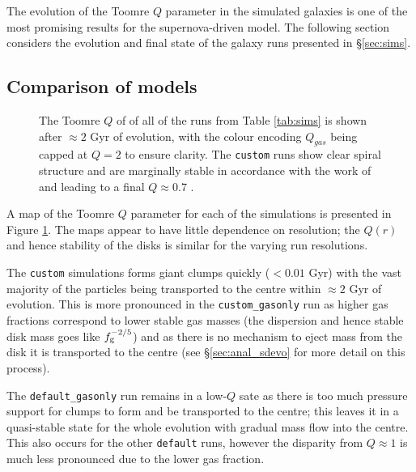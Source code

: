 The evolution of the Toomre $Q$ parameter in the simulated galaxies is one of the most promising results for the supernova-driven model.
The following section considers the evolution and final state of the galaxy runs presented in \S \ref{sec:sims}.

\subsection{Comparison of models}

\begin{figure}[!ht]
    \leavevmode\rlap{\usebox{\graphicsbox}}%
    \begin{minipage}[b]{0.63\wd\graphicsbox}%
        \caption{The Toomre $Q$ of of all of the runs from Table \ref{tab:sims} is shown after $\approx 2$ Gyr of evolution, with the colour encoding $Q_{gas}$ being capped at $Q=2$ to ensure clarity. The {\tt custom} runs show clear spiral structure and are marginally stable in accordance with the work of \citet{hopkins_stellar_2012} and \citep{behrendt_structure_2015} leading to a final $Q \approx 0.7$ .}
        \label{fig:toomqsimbigfig}
    \end{minipage}\hspace*{0.33\wd\graphicsbox}%
\end{figure}

A map of the Toomre $Q$ parameter for each of the simulations is presented in Figure \ref{fig:toomqsimbigfig}.
The maps appear to have little dependence on resolution; the $Q(r)$ and hence stability of the disks is similar for the varying run resolutions.

The {\tt custom} simulations forms giant clumps quickly ($<0.01$ Gyr) with the vast majority of the particles being transported to the centre within $\approx 2$ Gyr of evolution.
This is more pronounced in the {\tt custom\_gasonly} run as higher gas fractions correspond to lower stable gas masses (the dispersion and hence stable disk mass goes like $f_\mathrm{g}^{-2/5}$) and as there is no mechanism to eject mass from the disk it is transported to the centre (see \S \ref{sec:anal_sdevo} for more detail on this process).

The {\tt default\_gasonly} run remains in a low-$Q$ sate as there is too much pressure support for clumps to form and be transported to the centre; this leaves it in a quasi-stable state for the whole evolution with gradual mass flow into the centre.
This also occurs for the other {\tt default} runs, however the disparity from $Q \approx 1$ is much less pronounced due to the lower gas fraction.

